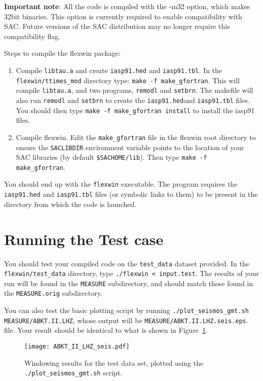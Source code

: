 {\bf Important note}: All the code is compiled with the -m32 option, which makes
32bit binaries.  This option is currently required to enable compatibility with
SAC.  Future versions of the SAC distribution may no longer require this
compatibility flag.

Steps to compile the flexwin package:
\begin{enumerate}
\item Compile {\tt libtau.a} and create {\tt iasp91.hed} and {\tt iasp91.tbl}.  In the {\tt flexwin/ttimes\_mod} directory type: {\tt make -f make\_gfortran}.  This will compile {\tt libtau.a}, and two programs, {\tt remodl} and {\tt setbrn}.  The makefile will also run {\tt remodl} and {\tt setbrn} to create the {\tt iasp91.hed}and {\tt iasp91.tbl} files.  You should then type {\tt make -f make\_gfortran install} to install the iasp91 files.
\item Compile flexwin.  Edit the {\tt make\_gfortran} file in the flexwin root directory to ensure the {\tt SACLIBDIR} environment variable points to the location of your SAC libraries (by default {\tt \$SACHOME/lib}).  Then type {\tt make -f make\_gfortran}.
\end{enumerate}

You should end up with the {\tt flexwin} executable.  The program requires the {\tt iasp91.hed} and {\tt iasp91.tbl} files (or symbolic links to them) to be present in the directory from which the code is launched. 


\section{Running the Test case}

You should test your compiled code on the {\tt test\_data} dataset provided.  In the
{\tt flexwin/test\_data} directory, type {\tt ./flexwin < input.test}.  The results of your
run will be found in the {\tt MEASURE} subdirectory, and
should match those found in the {\tt MEASURE.orig}
subdirectory.

You can also test the basic plotting script by running {\tt ./plot\_seismos\_gmt.sh
MEASURE/ABKT.II.LHZ}, whose output will be
{\tt MEASURE/ABKT.II.LHZ.seis.eps}.
file.  Your result should be identical to what is shown in Figure~\ref{fg:test_data}.

\begin{figure}
\center \texttt{[image: ABKT\_II\_LHZ\_seis.pdf]}
\caption{\label{fg:test_data}
Windowing results for the test data set, plotted using the {\tt ./plot\_seismos\_gmt.sh} script.
}
\end{figure}


